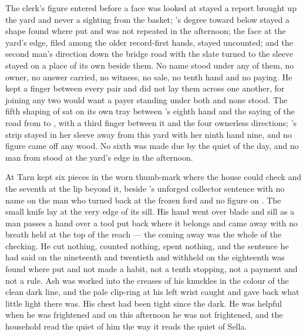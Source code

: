 The clerk's figure entered before a face was looked at stayed a report brought up the yard and never a sighting from the basket; 's degree toward  below  stayed a shape found where put and was not repeated in the afternoon; the face at the yard's edge, filed among the older record-first hands, stayed uncounted; and the second man's direction down the bridge road with the slate turned to the sleeve stayed on a place of its own beside them. No name stood under any of them, no owner, no answer carried, no witness, no sale, no tenth hand and no paying. He kept a finger between every pair and did not lay them across one another, for joining any two would want a payer standing under both and none stood. The fifth shaping of  sat on its own tray between 's eighth hand and the saying of the road from  to , with a third finger between it and the four ownerless directions; \person[Ilva]'s strip stayed in her sleeve away from this yard with her ninth hand nine, and no figure came off any wood. No sixth was made due by the quiet of the day, and no man from  stood at the yard's edge in the afternoon.

At  Tarn kept six pieces in the worn thumb-mark where the house could check and the seventh at the lip beyond it, beside 's unforged collector sentence with no name on the man who turned back at the frozen ford and no figure on . The small knife lay at the very edge of its sill. His hand went over blade and sill as a man passes a hand over a tool put back where it belongs and came away with no breath held at the top of the reach --- the coming away was the whole of the checking. He cut nothing, counted nothing, spent nothing, and the sentence he had said on the nineteenth and twentieth and withheld on the eighteenth was found where put and not made a habit, not a tenth stopping, not a payment and not a rule. Ash was worked into the creases of his knuckles in the colour of the clean dark line, and the pale clip-ring at his left wrist caught and gave back what little light there was. His chest had been tight since the dark. He was helpful when he was frightened and on this afternoon he was not frightened, and the household read the quiet of him the way it reads the quiet of Sella.

